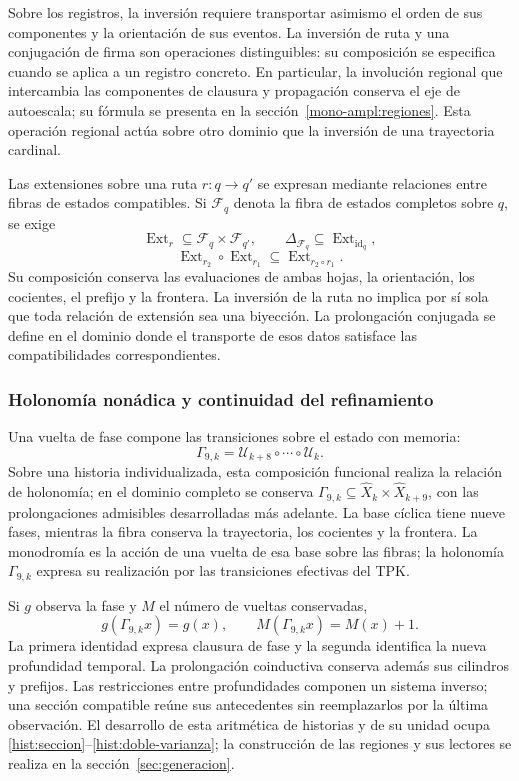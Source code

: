 Sobre los registros, la inversión requiere transportar asimismo el orden
de sus componentes y la orientación de sus eventos. La inversión de
ruta y una conjugación de firma son operaciones distinguibles: su
composición se especifica cuando se aplica a un registro concreto. En
particular, la involución regional que intercambia las componentes de
clausura y propagación conserva el eje de autoescala; su fórmula se
presenta en la sección~\ref{mono-ampl:regiones}. Esta operación regional
actúa sobre otro dominio que la inversión de una trayectoria cardinal.

Las extensiones sobre una ruta \(r:q\to q'\) se expresan mediante
relaciones entre fibras de estados compatibles. Si \(\mathcal F_q\)
denota la fibra de estados completos sobre \(q\), se exige
\[
 \operatorname{Ext}_r\subseteq\mathcal F_q\times\mathcal F_{q'},
 \qquad \Delta_{\mathcal F_q}\subseteq
        \operatorname{Ext}_{\operatorname{id}_q},
\]
\[
 \operatorname{Ext}_{r_2}\circ\operatorname{Ext}_{r_1}
       \subseteq\operatorname{Ext}_{r_2\circ r_1}.
\]
Su composición conserva las evaluaciones de ambas hojas, la orientación,
los cocientes, el prefijo y la frontera. La inversión de la ruta no
implica por sí sola que toda relación de extensión sea una biyección.
La prolongación conjugada se define en el dominio donde el transporte de
esos datos satisface las compatibilidades correspondientes.

\subsubsection{Holonomía nonádica y continuidad del refinamiento}
\label{tpk-int:holonomia}

Una vuelta de fase compone las transiciones sobre el estado con memoria:
\begin{equation}
 \Gamma_{9,k}=\mathcal U_{k+8}\circ\cdots\circ\mathcal U_k.
 \label{tpk-int:gamma}
\end{equation}
Sobre una historia individualizada, esta composición funcional realiza
la relación de holonomía; en el dominio completo se conserva
\(\Gamma_{9,k}\subseteq\widehat X_k\times\widehat X_{k+9}\),
con las prolongaciones admisibles desarrolladas más adelante.
La base cíclica tiene nueve fases, mientras
la fibra conserva la trayectoria, los cocientes y la frontera. La
monodromía es la acción de una vuelta de esa base sobre las fibras; la
holonomía \(\Gamma_{9,k}\) expresa su realización por las transiciones
efectivas del TPK.

Si \(g\) observa la fase y \(M\) el número de vueltas conservadas,
\[
 g(\Gamma_{9,k}x)=g(x),\qquad M(\Gamma_{9,k}x)=M(x)+1.
\]
La primera identidad expresa clausura de fase y la segunda identifica
la nueva profundidad temporal. La prolongación coinductiva conserva
además sus cilindros y prefijos. Las restricciones entre profundidades
componen un sistema inverso; una sección compatible reúne sus
antecedentes sin reemplazarlos por la última observación. El desarrollo
de esta aritmética de historias y de su unidad ocupa
\ref{hist:seccion}--\ref{hist:doble-varianza}; la construcción de las
regiones y sus lectores se realiza en la sección~\ref{sec:generacion}.

